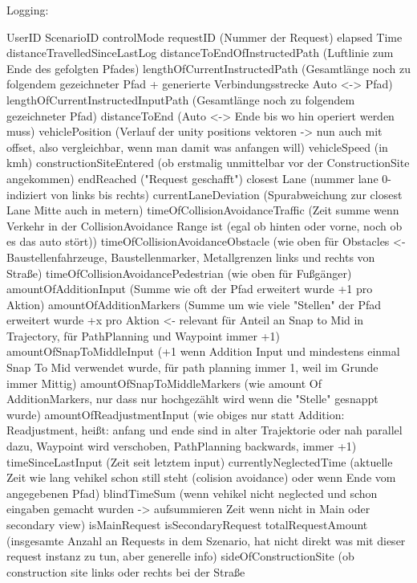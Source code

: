 Logging:


UserID
ScenarioID
controlMode
requestID (Nummer der Request)
elapsed Time
distanceTravelledSinceLastLog
distanceToEndOfInstructedPath (Luftlinie zum Ende des gefolgten Pfades)
lengthOfCurrentInstructedPath (Gesamtlänge noch zu folgendem gezeichneter Pfad + generierte Verbindungsstrecke Auto <-> Pfad)
lengthOfCurrentInstructedInputPath (Gesamtlänge noch zu folgendem gezeichneter Pfad)
distanceToEnd (Auto <-> Ende bis wo hin operiert werden muss)
vehiclePosition (Verlauf der unity positions vektoren -> nun auch mit offset, also vergleichbar, wenn man damit was anfangen will)
vehicleSpeed (in kmh)
constructionSiteEntered (ob erstmalig unmittelbar vor der ConstructionSite angekommen)
endReached ("Request geschafft")
closest Lane (nummer lane 0-indiziert von links bis rechts)
currentLaneDeviation (Spurabweichung zur closest Lane Mitte  auch in metern)
timeOfCollisionAvoidanceTraffic (Zeit summe wenn Verkehr in der CollisionAvoidance Range ist (egal ob hinten oder vorne, noch ob es das auto stört))
timeOfCollisionAvoidanceObstacle (wie oben für Obstacles <- Baustellenfahrzeuge, Baustellenmarker, Metallgrenzen links und rechts von Straße)
timeOfCollisionAvoidancePedestrian (wie oben für Fußgänger)
amountOfAdditionInput (Summe wie oft der Pfad erweitert wurde +1 pro Aktion)
amountOfAdditionMarkers (Summe um wie viele "Stellen" der Pfad erweitert wurde +x pro Aktion <- relevant für Anteil an Snap to Mid in Trajectory, für PathPlanning und Waypoint immer +1)
amountOfSnapToMiddleInput (+1 wenn Addition Input und mindestens einmal Snap To Mid verwendet wurde, für path planning immer 1, weil im Grunde immer Mittig)
amountOfSnapToMiddleMarkers (wie amount Of AdditionMarkers, nur dass nur hochgezählt wird wenn die "Stelle" gesnappt wurde)
amountOfReadjustmentInput (wie obiges nur statt Addition: Readjustment, heißt: anfang und ende sind in alter Trajektorie oder nah parallel dazu, Waypoint wird verschoben, PathPlanning backwards, immer +1)
timeSinceLastInput (Zeit seit letztem input)
currentlyNeglectedTime (aktuelle Zeit wie lang vehikel schon still steht (colision avoidance) oder wenn Ende vom angegebenen Pfad)
blindTimeSum (wenn vehikel nicht neglected und schon eingaben gemacht wurden -> aufsummieren Zeit wenn nicht in Main oder secondary view)
isMainRequest
isSecondaryRequest
totalRequestAmount (insgesamte Anzahl an Requests in dem Szenario, hat nicht direkt was mit dieser request instanz zu tun, aber generelle info)
sideOfConstructionSite (ob construction site links oder rechts bei der Straße




